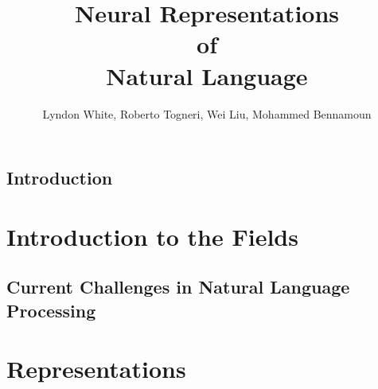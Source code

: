 \documentclass[12pt,parskip]{komatufte}
\begin{document}
\title{Neural Representations \\of\\ Natural Language}
\author{Lyndon White, Roberto Togneri, Wei Liu, Mohammed Bennamoun}
\publishers{SpringerBriefs in Computer Science}

\maketitle

\tableofcontents

\chapter{Introduction}\label{sec:introduction}

\part{Introduction to the Fields}\label{sec:introduction-to-the-fields}




\chapter{Current Challenges in Natural Language Processing}\label{sec:current-challenges-in-natural-language-processing}

\part{Representations}\label{sec:representations}
\end{document}
